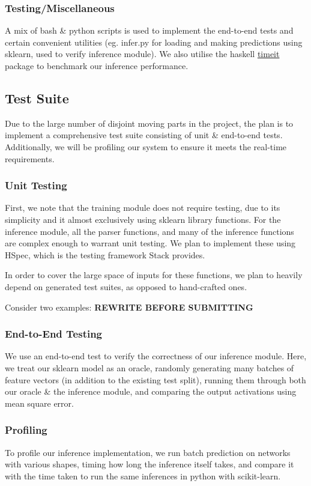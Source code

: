 \documentclass[12pt, titlepage]{article}
\begin{document}
\subsubsection{Testing/Miscellaneous}
A mix of bash \& python scripts is used to implement the end-to-end tests and certain convenient utilities (eg. infer.py for loading and making predictions using sklearn, used to verify inference module). We also utilise the haskell \href{https://hackage.haskell.org/package/timeit}{timeit} package to benchmark our inference performance.

\subsection{Test Suite}
Due to the large number of disjoint moving parts in the project, the plan is to implement a comprehensive test suite consisting of unit \& end-to-end tests. Additionally, we will be profiling our system to ensure it meets the real-time requirements.

\subsubsection{Unit Testing}
First, we note that the training module does not require testing, due to its simplicity and it almost exclusively using sklearn library functions. For the inference module, all the parser functions, and many of the inference functions are complex enough to warrant unit testing. We plan to implement these using HSpec, which is the testing framework Stack provides.\bigskip

In order to cover the large space of inputs for these functions, we plan to heavily depend on generated test suites, as opposed to hand-crafted ones.

Consider two examples: \textbf{REWRITE BEFORE SUBMITTING}

\subsubsection{End-to-End Testing}\label{sec:7.2.2}
We use an end-to-end test to verify the correctness of our inference module. Here, we treat our sklearn model as an oracle, randomly generating many batches of feature vectors (in addition to the existing test split), running them through both our oracle \& the inference module, and comparing the output activations using mean square error.

\subsubsection{Profiling}
To profile our inference implementation, we run batch prediction on networks with various shapes, timing how long the inference itself takes, and compare it with the time taken to run the same inferences in python with scikit-learn.
\end{document}
